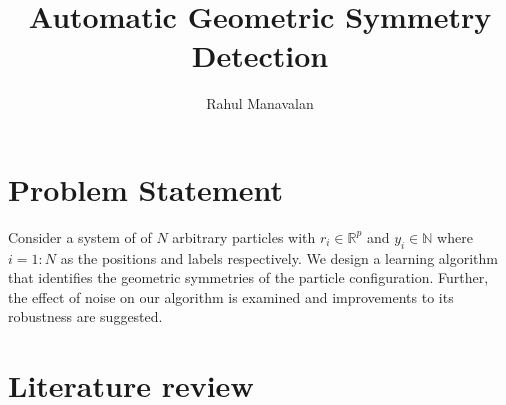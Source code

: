 \documentclass{article}
\title{Automatic Geometric Symmetry Detection}
\author{Rahul Manavalan}
\date{}
\begin{document}
\maketitle

\section{Problem Statement}
Consider a system of of $N$ arbitrary particles with $r_{i} \in \mathbb{R}^{p}$ and $y_{i} \in \mathbb{N}$ where $i=1:N$ as the positions and labels respectively.
We design a learning algorithm that identifies the geometric symmetries of the particle configuration.
Further, the effect of noise on our algorithm is examined and improvements to its robustness are suggested.

\section{Literature review}


\end{document}
